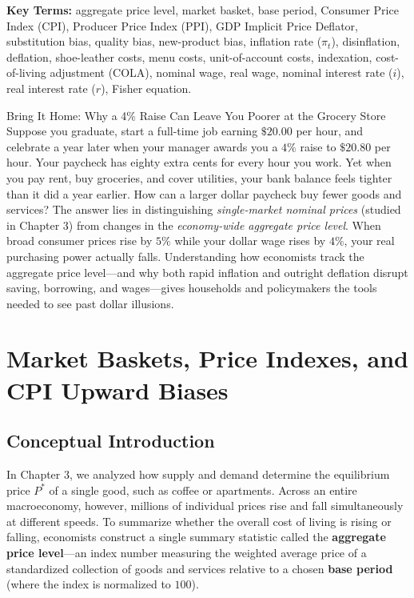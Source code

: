 \documentclass[11pt,letterpaper]{article}
\begin{document}
\noindent\textbf{Key Terms:} aggregate price level, market basket, base period, Consumer Price Index (CPI), Producer Price Index (PPI), GDP Implicit Price Deflator, substitution bias, quality bias, new-product bias, inflation rate ($\pi_t$), disinflation, deflation, shoe-leather costs, menu costs, unit-of-account costs, indexation, cost-of-living adjustment (COLA), nominal wage, real wage, nominal interest rate ($i$), real interest rate ($r$), Fisher equation.

\begin{examplecase}{Bring It Home: Why a 4\% Raise Can Leave You Poorer at the Grocery Store}
Suppose you graduate, start a full-time job earning $\$20.00$ per hour, and celebrate a year later when your manager awards you a $4\%$ raise to $\$20.80$ per hour. Your paycheck has eighty extra cents for every hour you work. Yet when you pay rent, buy groceries, and cover utilities, your bank balance feels tighter than it did a year earlier. How can a larger dollar paycheck buy fewer goods and services? The answer lies in distinguishing \emph{single-market nominal prices} (studied in Chapter 3) from changes in the \emph{economy-wide aggregate price level}. When broad consumer prices rise by $5\%$ while your dollar wage rises by $4\%$, your real purchasing power actually falls. Understanding how economists track the aggregate price level—and why both rapid inflation and outright deflation disrupt saving, borrowing, and wages—gives households and policymakers the tools needed to see past dollar illusions.
\end{examplecase}

\section{Market Baskets, Price Indexes, and CPI Upward Biases}

\subsection*{Conceptual Introduction}
In Chapter 3, we analyzed how supply and demand determine the equilibrium price $P^*$ of a single good, such as coffee or apartments. Across an entire macroeconomy, however, millions of individual prices rise and fall simultaneously at different speeds. To summarize whether the overall cost of living is rising or falling, economists construct a single summary statistic called the \textbf{aggregate price level}—an index number measuring the weighted average price of a standardized collection of goods and services relative to a chosen \textbf{base period} (where the index is normalized to $100$).
\end{document}
